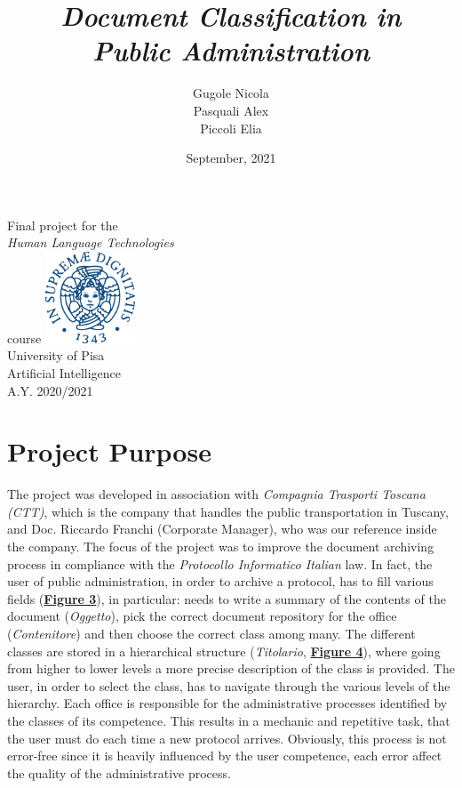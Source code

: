 \documentclass[12pt]{article}
\title{\textit{Document Classification in \\Public Administration}}
\author{Gugole Nicola\\Pasquali Alex\\Piccoli Elia}
\date{September, 2021}
\begin{document}
\begin{titlepage}
	\maketitle
   \begin{center}
	\vspace{0.5cm}
       Final project for the\\ \textit{Human Language Technologies}\\ course
       \vfill	     
       \includegraphics[width=0.2\textwidth]{unipi.png}\\
       University of Pisa\\
       Artificial Intelligence\\
       A.Y. 2020/2021\\
   \end{center}
\end{titlepage}
\newpage
{\small\tableofcontents}
\newpage

\section{Project Purpose}\label{sec:projectpurpose}
The project was developed in association with \textit{Compagnia Trasporti Toscana (CTT)}, which is the company that handles the public transportation in Tuscany, and Doc. Riccardo Franchi (Corporate Manager), who was our reference inside the company.
The focus of the project was to improve the document archiving process in compliance with the \textit{Protocollo Informatico Italian} law. In fact, the user of public administration, in order to archive a protocol, has to fill various fields (\hyperref[fig:interface]{\textbf{Figure 3}}), in particular: needs to write a summary of the contents of the document (\textit{Oggetto}), pick the correct document repository for the office (\textit{Contenitore}) and then choose the correct class among many. The different classes are stored in a hierarchical structure (\textit{Titolario}, \hyperref[fig:classinterface]{\textbf{Figure 4}}), where going from higher to lower levels a more precise description of the class is provided. The user, in order to select the class, has to navigate through the various levels of the hierarchy. Each office is responsible for the administrative processes identified by the classes of its competence. This results in a mechanic and repetitive task, that the user must do each time a new protocol arrives. Obviously, this process is not error-free since it is heavily influenced by the user competence, each error affect the quality of the administrative process.\\
\end{document}
